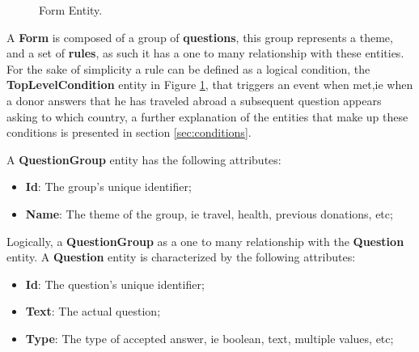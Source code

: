 \begin{figure}[H]
	\begin{center}
	\end{center}
	\caption{Form Entity.}\label{fig:form_entity}
\end{figure}

A \textbf{Form} is composed of a group of \textbf{questions}, this group represents a theme, and a set of \textbf{rules}, as such it has a one to many relationship with these entities.
For the sake of simplicity a rule can be defined as a logical condition, the \textbf{TopLevelCondition} entity in Figure \ref{fig:form_entity}, that triggers an event when met,ie when a donor answers that he has traveled abroad a subsequent question appears asking to which country, a further explanation of the entities that make up these conditions is presented in section \ref{sec:conditions}.

A \textbf{QuestionGroup} entity has the following attributes:
\begin{itemize}
	\item \textbf{Id}: The group's unique identifier;
	\item \textbf{Name}: The theme of the group, ie travel, health, previous donations, etc;
\end{itemize}

Logically, a \textbf{QuestionGroup} as a one to many relationship with the \textbf{Question} entity.
A \textbf{Question} entity is characterized by the following attributes:
\begin{itemize}
	\item \textbf{Id}: The question's unique identifier;
	\item \textbf{Text}: The actual question;
	\item \textbf{Type}: The type of accepted answer, ie boolean, text, multiple values, etc;
\end{itemize}

